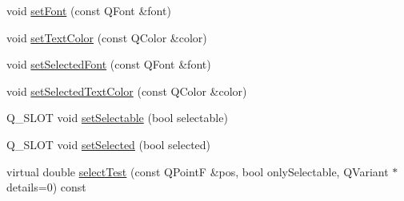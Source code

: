 \begin{DoxyCompactItemize}
\item 
void \hyperlink{classQCPAbstractLegendItem_a409c53455d8112f71d70c0c43eb10265}{set\+Font} (const Q\+Font \&font)
\item 
void \hyperlink{classQCPAbstractLegendItem_a6ebace6aaffaedcdab2d74e88acc2d1e}{set\+Text\+Color} (const Q\+Color \&color)
\item 
void \hyperlink{classQCPAbstractLegendItem_a91db5aee48617a9d3206e61376807365}{set\+Selected\+Font} (const Q\+Font \&font)
\item 
void \hyperlink{classQCPAbstractLegendItem_a4d01d008ee1a5bfe9905b0397a421936}{set\+Selected\+Text\+Color} (const Q\+Color \&color)
\item 
Q\+\_\+\+S\+L\+O\+T void \hyperlink{classQCPAbstractLegendItem_a9913ef48730551b696e7f98a2391c599}{set\+Selectable} (bool selectable)
\item 
Q\+\_\+\+S\+L\+O\+T void \hyperlink{classQCPAbstractLegendItem_a6eed93b0ab99cb3eabb043fb08179c2b}{set\+Selected} (bool selected)
\item 
virtual double \hyperlink{classQCPAbstractLegendItem_ad0480d5cad34627a294a2921caa4a62f}{select\+Test} (const Q\+Point\+F \&pos, bool only\+Selectable, Q\+Variant $\ast$details=0) const 
\end{DoxyCompactItemize}

